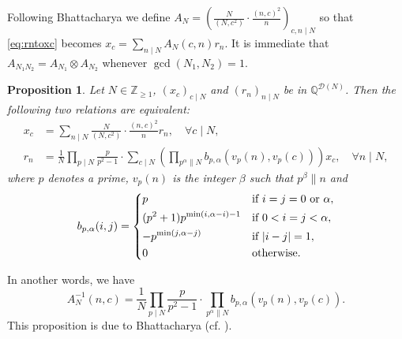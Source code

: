 \documentclass[12pt]{amsart}
\numberwithin{equation}{section}
\theoremstyle{plain}
\newtheorem{prop}[thm]{Proposition}
\theoremstyle{definition}
\theoremstyle{remark}
\newcommand*\abs[1]{\lvert#1\rvert}
\newcommand\numQ{\mathbb{Q}}
\newcommand\numgeq[2]{\mathbb{#1}_{\geq #2}}
\begin{document}
Following Bhattacharya \cite{Bha17} we define $A_N=\left(\frac{N}{(N,c^2)}\cdot\frac{(n,c)^2}{n}\right)_{c,n\mid N}$ so that \eqref{eq:rntoxc} becomes $x_c=\sum_{n\mid N}A_N(c,n)r_n$. It is immediate that $A_{N_1N_2}=A_{N_1}\otimes A_{N_2}$ whenever $\gcd(N_1,N_2)=1$.
\begin{prop}
\label{prop:rnxc}
Let $N\in\numgeq{Z}{1}$, $(x_c)_{c\mid N}$ and $(r_n)_{n\mid N}$ be in $\numQ^{\mathscr{D}(N)}$. Then the following two relations are equivalent:
\begin{align}
x_c&=\sum_{n\mid N}\frac{N}{(N,c^2)}\cdot\frac{(n,c)^2}{n}r_n,\quad \forall c\mid N, \label{eq:rntoxc2}\\
r_n&=\frac{1}{N}\prod_{p \mid N}\frac{p}{p^2-1}\cdot\sum_{c\mid N}\left(\prod_{p^\alpha \parallel N}b_{p,\alpha}(v_p(n),v_p(c))\right)x_c,\quad \forall n\mid N, \label{eq:xctorn}
\end{align}
where $p$ denotes a prime, $v_p(n)$ is the integer $\beta$ such that $p^\beta\parallel n$ and
\begin{equation*}
b_{p,\alpha}(i,j)=\begin{dcases}
p &\text{if } i=j=0\text{ or }\alpha,\\
(p^2+1)p^{\min(i,\alpha-i)-1} &\text{if } 0<i=j<\alpha,\\
-p^{\min(j,\alpha-j)} &\text{if } \abs{i-j}=1,\\
0 &\text{otherwise}.
\end{dcases}
\end{equation*}
\end{prop}
In another words, we have
\begin{equation*}
A_N^{-1}(n,c)=\frac{1}{N}\prod_{p \mid N}\frac{p}{p^2-1}\cdot\prod_{p^\alpha \parallel N}b_{p,\alpha}(v_p(n),v_p(c)).
\end{equation*}
This proposition is due to Bhattacharya (cf. \cite[Eq. (5.13)]{Bha17}).
\end{document}
